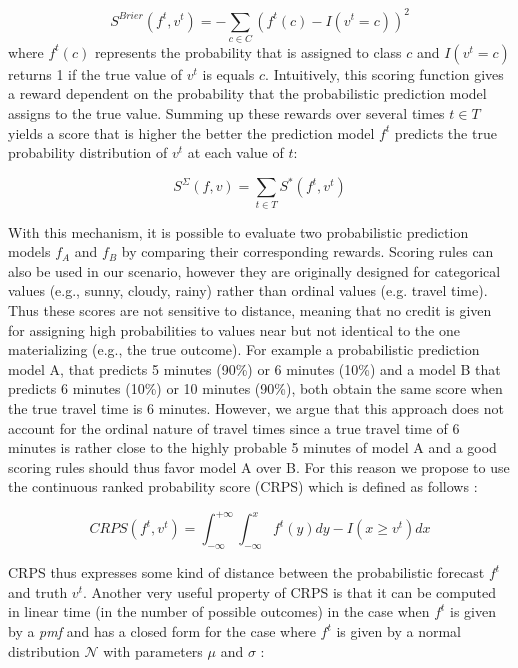 $$
	S^{Brier}(f^t, v^t) = -\sum_{c \in C} (f^t(c) - I(v^t = c))^2
$$
where $f^t(c)$ represents the probability that is assigned to class $c$ and
$I(v^t = c)$ returns 1 if the true value of $v^t$ is equals $c$.
Intuitively, this scoring function gives a reward dependent on the
probability that the probabilistic prediction model assigns to the true value.
Summing up these rewards over several times $t \in T$ yields a score that is
higher the better the prediction model $f^t$ predicts the true probability
distribution of $v^t$ at each value of $t$:

\vspace{0.1cm}

$$
	S^\Sigma (f, v) = \sum_{t \in T} S^*(f^t, v^t)
$$

\vspace{0.1cm}

With this mechanism, it is possible to evaluate two probabilistic prediction
models $f_A$ and $f_B$ by comparing their corresponding rewards.
Scoring rules can also be used in our scenario, however they are originally
designed for categorical values (e.g., sunny, cloudy, rainy) rather than ordinal
values (e.g. travel time). Thus these scores are not sensitive to distance,
meaning that no credit is given for assigning high probabilities to values near
but not identical to the one materializing (e.g., the true outcome). For example
a probabilistic prediction model A, that predicts 5 minutes (90\%) or 6
minutes (10\%) and a model B that predicts 6 minutes (10\%) or 10 minutes
(90\%), both obtain the same score when the true travel time is 6 minutes. However, we argue that this approach
does not account for the ordinal nature of travel times since a true travel time
of 6 minutes is rather close to the highly probable 5 minutes of model A and a
good scoring rules should thus favor model A over B. For this reason we propose
to use the continuous ranked probability score (CRPS) which is defined as
follows \cite{Hersbach00}:

\vspace{0.1cm}

\begin{equation}
CRPS(f^t, v^t) = \int_{-\infty}^{+\infty} \int_{-\infty}^{x} f^t(y) dy - I(x
\geq v^t) dx
\end{equation}

\vspace{0.1cm}

CRPS thus expresses some kind of distance between the probabilistic forecast
$f^t$ and truth $v^t$. Another very useful property of CRPS is that it can be computed in
linear time (in the number of possible outcomes) in the case when $f^t$ is given
by a \textit{pmf} and has a closed form for the case where $f^t$ is given by a
normal distribution $\mathcal{N}$ with parameters $\mu$ and $\sigma$ \cite{Gneiting04}:

